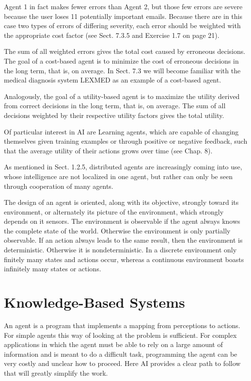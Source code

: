 \documentclass[10pt]{book}
\begin{document}
Agent 1 in fact makes fewer errors than Agent 2, but those few errors are severe because the user loses 11 potentially important emails. Because there are in this case two types of errors of differing severity, each error should be weighted with the appropriate cost factor (see Sect. 7.3.5 and Exercise 1.7 on page 21).

The sum of all weighted errors gives the total cost caused by erroneous decisions. The goal of a cost-based agent is to minimize the cost of erroneous decisions in the long term, that is, on average. In Sect. 7.3 we will become familiar with the medical diagnosis system LEXMED as an example of a cost-based agent.

Analogously, the goal of a utility-based agent is to maximize the utility derived from correct decisions in the long term, that is, on average. The sum of all decisions weighted by their respective utility factors gives the total utility.

Of particular interest in AI are Learning agents, which are capable of changing themselves given training examples or through positive or negative feedback, such that the average utility of their actions grows over time (see Chap. 8).

As mentioned in Sect. 1.2.5, distributed agents are increasingly coming into use, whose intelligence are not localized in one agent, but rather can only be seen through cooperation of many agents.

The design of an agent is oriented, along with its objective, strongly toward its environment, or alternately its picture of the environment, which strongly depends on it sensors. The environment is observable if the agent always knows the complete state of the world. Otherwise the environment is only partially observable. If an action always leads to the same result, then the environment is deterministic. Otherwise it is nondeterministic. In a discrete environment only finitely many states and actions occur, whereas a continuous environment boasts infinitely many states or actions.

\section{Knowledge-Based Systems}
An agent is a program that implements a mapping from perceptions to actions. For simple agents this way of looking at the problem is sufficient. For complex applications in which the agent must be able to rely on a large amount of information and is meant to do a difficult task, programming the agent can be very costly and unclear how to proceed. Here AI provides a clear path to follow that will greatly simplify the work.
\end{document}
